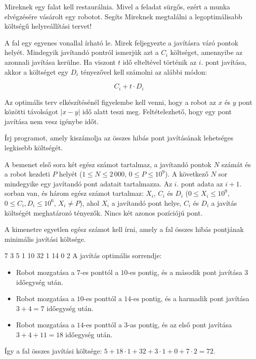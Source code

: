 





Mireknek egy falat kell restaurálnia. Mivel a feladat sürgős, ezért a munka elvégzésére vásárolt egy robotot. Segíts Mireknek megtalálni a legoptimálisabb költségű helyreállítási tervet!

A fal egy egyenes vonallal írható le. Mirek feljegyezte a javításra váró pontok helyét. Mindegyik javítandó pontról ismerjük azt a $C_i$ költséget, amennyibe az azonnali javítása kerülne. Ha viszont $t$ idő elteltével történik az $i$. pont javítása, akkor a költséget egy $D_i$ tényezővel kell számolni az alábbi módon: 

\[ C_i + t \cdot D_i \]

Az optimális terv elkészítésénél figyelembe kell venni, hogy a robot az $x$ és $y$ pont közötti távolságot $|x - y|$ idő alatt teszi meg. Feltételezhető, hogy egy pont javítása nem vesz igénybe időt.



Írj programot, amely kiszámolja az összes hibás pont javításának lehetséges legkisebb költségét. 


A bemenet első sora két egész számot tartalmaz, a javítandó pontok $N$ számát és a robot kezdeti $P$ helyét ($1 \le N \le 2\,000$, $0 \le P \le 10^9$).
A következő $N$ sor mindegyike egy javítandó pont adatait tartalmazza. Az $i$. pont adata az $i+1$. sorban van, és három egész számot tartalmaz: $X_i$, $C_i$ és $D_i$ ($0 \le X_i \le 10^9$, $0 \le C_i, D_i \le 10^6$, $X_i \neq P$), ahol $X_i$ a javítandó pont helye, $C_i$ és $D_i$ a javítás költségét meghatározó tényezők. Nincs két azonos pozíciójú pont.


A kimenetre egyetlen egész számot kell írni, amely a fal összes hibás pontjának minimális javítási költsége.



 7
3 5 1
10 32 1
14 0 2
\sampleCOMMENT
A javítás optimális sorrendje:
\begin{itemize}
	\item Robot mozgatása a $7$-es ponttól a $10$-es pontig, és a második pont javítása $3$ időegység után.
	\item Robot mozgatása a $10$-es ponttól a $14$-es pontig, és a harmadik pont javítása $3 + 4 = 7$ időegység után.
	\item Robot mozgatása a $14$-es ponttól a $3$-as pontig, és az első pont javítása $3 + 4 + 11 = 18$ időegység után.
\end{itemize}
Így a fal összes javítási költsége: $5 + 18 \cdot 1 + 32 + 3 \cdot 1 + 0 + 7 \cdot 2 = 72$.
\sampleEND



